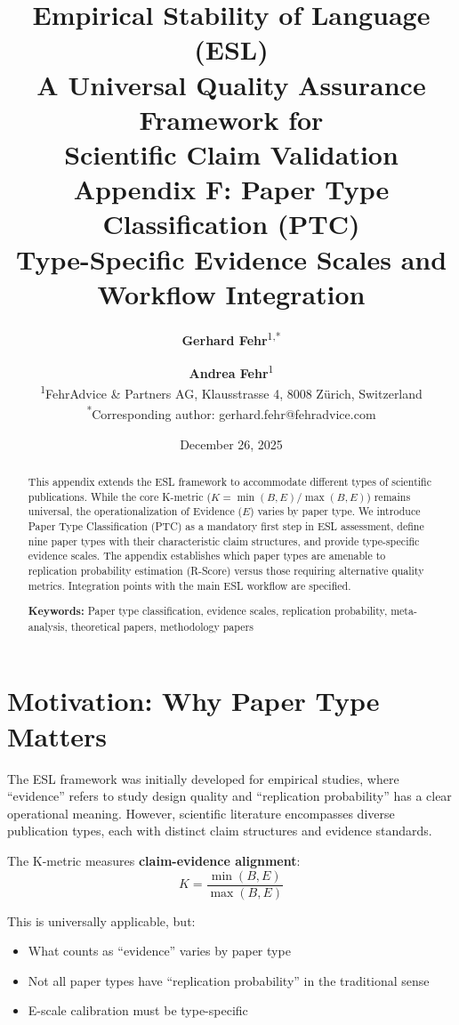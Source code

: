 \documentclass[11pt,a4paper]{article}
\title{%
    \Large \textbf{Empirical Stability of Language (ESL)} \\[0.5em]
    \large A Universal Quality Assurance Framework for \\
    Scientific Claim Validation \\[1em]
    \LARGE \textbf{Appendix F: Paper Type Classification (PTC)} \\[0.3em]
    \large Type-Specific Evidence Scales and Workflow Integration
}
\author{%
    \textbf{Gerhard Fehr}\textsuperscript{1,*} \and \textbf{Andrea Fehr}\textsuperscript{1} \\[0.5em]
    \textsuperscript{1}FehrAdvice \& Partners AG, Klausstrasse 4, 8008 Zürich, Switzerland \\[0.3em]
    \textsuperscript{*}Corresponding author: gerhard.fehr@fehradvice.com
}
\date{December 26, 2025}
\begin{document}
\maketitle


\begin{abstract}
\noindent
This appendix extends the ESL framework to accommodate different types of scientific publications. While the core K-metric ($K = \min(B,E)/\max(B,E)$) remains universal, the operationalization of Evidence ($E$) varies by paper type. We introduce Paper Type Classification (PTC) as a mandatory first step in ESL assessment, define nine paper types with their characteristic claim structures, and provide type-specific evidence scales. The appendix establishes which paper types are amenable to replication probability estimation (R-Score) versus those requiring alternative quality metrics. Integration points with the main ESL workflow are specified.

\vspace{0.5em}
\noindent\textbf{Keywords:} Paper type classification, evidence scales, replication probability, meta-analysis, theoretical papers, methodology papers
\end{abstract}

\tableofcontents
\newpage


\section{Motivation: Why Paper Type Matters}
\label{sec:motivation}

The ESL framework was initially developed for empirical studies, where ``evidence'' refers to study design quality and ``replication probability'' has a clear operational meaning. However, scientific literature encompasses diverse publication types, each with distinct claim structures and evidence standards.

\begin{keyinsight}[title={The Generalization Challenge}]
The K-metric measures \textbf{claim-evidence alignment}:
\begin{equation}
K = \frac{\min(B, E)}{\max(B, E)}
\end{equation}

This is universally applicable, but:
\begin{itemize}
    \item What counts as ``evidence'' varies by paper type
    \item Not all paper types have ``replication probability'' in the traditional sense
    \item E-scale calibration must be type-specific
\end{itemize}
\end{keyinsight}
\end{document}
